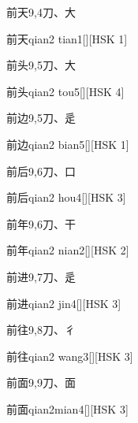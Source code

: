 \begin{entry}{前天}{9,4}{⼑、⼤}
  \begin{phonetics}{前天}{qian2 tian1}[][HSK 1]
  \end{phonetics}
\end{entry}

\begin{entry}{前头}{9,5}{⼑、⼤}
  \begin{phonetics}{前头}{qian2 tou5}[][HSK 4]
  \end{phonetics}
\end{entry}

\begin{entry}{前边}{9,5}{⼑、⾡}
  \begin{phonetics}{前边}{qian2 bian5}[][HSK 1]
  \end{phonetics}
\end{entry}

\begin{entry}{前后}{9,6}{⼑、⼝}
  \begin{phonetics}{前后}{qian2 hou4}[][HSK 3]
  \end{phonetics}
\end{entry}

\begin{entry}{前年}{9,6}{⼑、⼲}
  \begin{phonetics}{前年}{qian2 nian2}[][HSK 2]
  \end{phonetics}
\end{entry}

\begin{entry}{前进}{9,7}{⼑、⾡}
  \begin{phonetics}{前进}{qian2 jin4}[][HSK 3]
  \end{phonetics}
\end{entry}

\begin{entry}{前往}{9,8}{⼑、⼻}
  \begin{phonetics}{前往}{qian2 wang3}[][HSK 3]
  \end{phonetics}
\end{entry}

\begin{entry}{前面}{9,9}{⼑、⾯}
  \begin{phonetics}{前面}{qian2mian4}[][HSK 3]
  \end{phonetics}
\end{entry}

